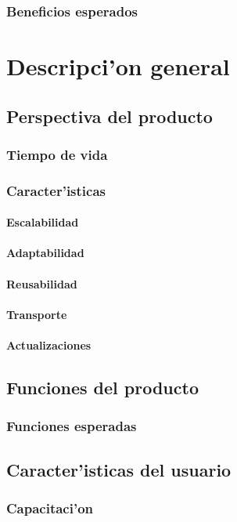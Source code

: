 \documentclass[letterpaper,openright,10pt,oneside]{report}
\begin{document}
			\subsection{Beneficios esperados}
	\chapter{Descripci'on general}
		\section{Perspectiva del producto}
			\subsection{Tiempo de vida}
			\subsection{Caracter'isticas}
				\subsubsection{Escalabilidad}
				\subsubsection{Adaptabilidad}
				\subsubsection{Reusabilidad}
				\subsubsection{Transporte}
				\subsubsection{Actualizaciones}
		\section{Funciones del producto}
			\subsection{Funciones esperadas}
		\section{Caracter'isticas del usuario}
			\subsection{Capacitaci'on}
\end{document}
